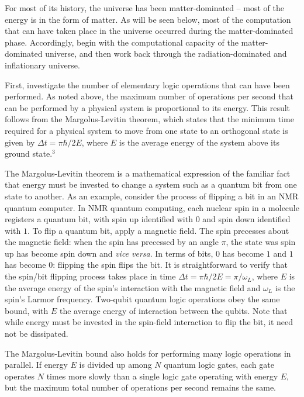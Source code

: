 For most of its history, the universe has been
matter-dominated -- most of the energy is in the form of matter.
As will be seen below, most of the computation that can have taken
place in the universe occurred during the matter-dominated phase.
Accordingly, begin with the computational capacity of the
matter-dominated universe, and then work back through the 
radiation-dominated and inflationary universe.

\bigskip{}


First, investigate the number of elementary logic operations that can
have been performed.  As noted above, the maximum number of operations
per second that can be performed by a physical system is proportional
to its energy.  This result follows from the Margolus-Levitin theorem, 
which states that the minimum time required for a physical system to
move from one state to an orthogonal state is given by 
$\Delta t = \pi \hbar/2 E$, where $E$ is the average energy of
the system above its ground state.$^3$ 

The Margolus-Levitin theorem is a mathematical expression of the
familiar fact that energy must be invested to change a system
such as a quantum bit from one state to another.
As an example, consider the process of flipping a bit in an NMR
quantum computer.  In NMR quantum computing, each nuclear spin in
a molecule registers a quantum
bit, with spin up identified with $0$ and spin down identified
with $1$.  To flip a quantum bit, apply a magnetic field.   
The spin precesses about the magnetic field: when the spin has precessed
by an angle $\pi$, the state was spin up has become spin down and
{\it vice versa}.  In terms of bits, $0$ has become $1$ and
$1$ has become $0$: flipping the spin flips the bit.
It is straightforward to verify that the spin/bit flipping process
takes place in time $\Delta t = \pi \hbar /2 E = \pi/\omega_L$, where 
$E$ is the average energy of the spin's interaction with the magnetic
field and $\omega_L$ is the spin's Larmor frequency.  Two-qubit quantum
logic operations obey the same bound, with $E$ the average energy of
interaction between the qubits.   Note that while energy must be
invested in the spin-field interaction to flip the bit, it need
not be dissipated.

The Margolus-Levitin bound also holds for performing many logic
operations in parallel.  If energy $E$ is divided up among $N$
quantum logic gates, each gate operates $N$ times more slowly
than a single logic gate operating with energy $E$, but the maximum
total number of operations per second remains the same.

